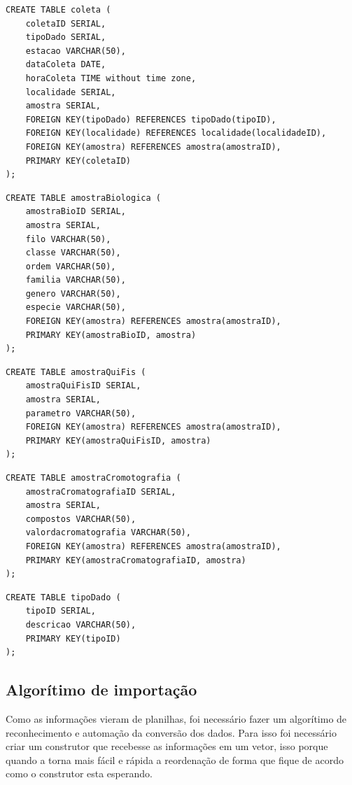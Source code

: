 \begin{lstlisting}[frame=single]
CREATE TABLE coleta (
	coletaID SERIAL,
	tipoDado SERIAL,
	estacao VARCHAR(50),
	dataColeta DATE,
	horaColeta TIME without time zone,
	localidade SERIAL,
	amostra SERIAL,
	FOREIGN KEY(tipoDado) REFERENCES tipoDado(tipoID),
    FOREIGN KEY(localidade) REFERENCES localidade(localidadeID),
	FOREIGN KEY(amostra) REFERENCES amostra(amostraID),
	PRIMARY KEY(coletaID)
);
\end{lstlisting}

\begin{lstlisting}[frame=single]
CREATE TABLE amostraBiologica (
	amostraBioID SERIAL,
	amostra SERIAL,
	filo VARCHAR(50),
	classe VARCHAR(50),
	ordem VARCHAR(50),
	familia VARCHAR(50),
	genero VARCHAR(50),
	especie VARCHAR(50),
	FOREIGN KEY(amostra) REFERENCES amostra(amostraID),
	PRIMARY KEY(amostraBioID, amostra)
);
\end{lstlisting}

\begin{lstlisting}[frame=single]
CREATE TABLE amostraQuiFis (
	amostraQuiFisID SERIAL,
	amostra SERIAL,
	parametro VARCHAR(50),
	FOREIGN KEY(amostra) REFERENCES amostra(amostraID),
	PRIMARY KEY(amostraQuiFisID, amostra)
);
\end{lstlisting}

\begin{lstlisting}[frame=single]
CREATE TABLE amostraCromotografia (
	amostraCromatografiaID SERIAL,
	amostra SERIAL,
	compostos VARCHAR(50),
	valordacromatografia VARCHAR(50),
	FOREIGN KEY(amostra) REFERENCES amostra(amostraID),
	PRIMARY KEY(amostraCromatografiaID, amostra)
);
\end{lstlisting}

\begin{lstlisting}[frame=single]
CREATE TABLE tipoDado (
	tipoID SERIAL,
	descricao VARCHAR(50),
	PRIMARY KEY(tipoID)
);
\end{lstlisting}

\subsection{Algorítimo de importação}

Como as informações vieram de planilhas, foi necessário fazer um algorítimo de reconhecimento e automação da conversão dos dados. Para isso foi necessário criar um construtor que recebesse as informações em um vetor, isso porque quando a torna mais fácil e rápida a reordenação de forma que fique de acordo como o construtor esta esperando.


